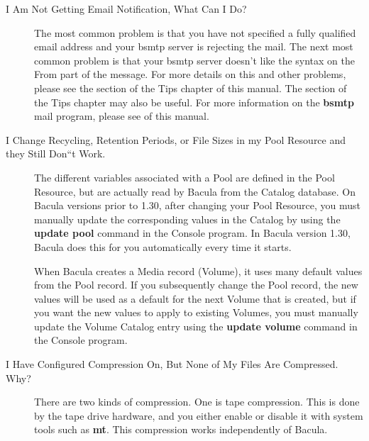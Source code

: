 \begin{description}
\item [I Am Not Getting Email Notification, What Can I Do?

   ]
The most common problem is that you have not specified a fully  qualified
email address and your bsmtp server is rejecting the mail.  The next most
common problem is that your bsmtp server doesn't like  the syntax on the From
part of the message. For more details on this  and other problems, please see
the 
 section of the
Tips chapter  of this manual. The section 
 of the Tips
chapter may also  be useful. For more information on the {\bf bsmtp} mail
program,  please see 
 of this
manual.

\label{periods}

\item [I Change Recycling, Retention Periods, or File Sizes in my Pool
   Resource  and they Still Don``t Work.]
  The different variables associated with a Pool are defined in the  Pool
  Resource, but are actually read by Bacula from the Catalog database.  On
  Bacula versions prior to 1.30, after changing your Pool Resource,  you must
  manually update the corresponding values in the Catalog by  using the {\bf
  update pool} command in the Console program. In Bacula  version 1.30, Bacula
  does this for you automatically every time it  starts.  
  
  When Bacula creates a Media record (Volume), it uses many default  values from
  the Pool record. If you subsequently change the Pool  record, the new values
  will be used as a default for the next Volume  that is created, but if you
  want the new values to apply to existing  Volumes, you must manually update
  the Volume Catalog entry using  the {\bf update volume} command in the Console
  program. 

\label{CompressionNotWorking}
\item [I Have Configured Compression On, But None of My Files Are
   Compressed.  Why?]
   There are two kinds of compression. One is tape compression. This  is done by
   the tape drive hardware, and you either enable or disable  it with system
   tools such as {\bf mt}. This compression works  independently of Bacula.  
   

\end{description}
